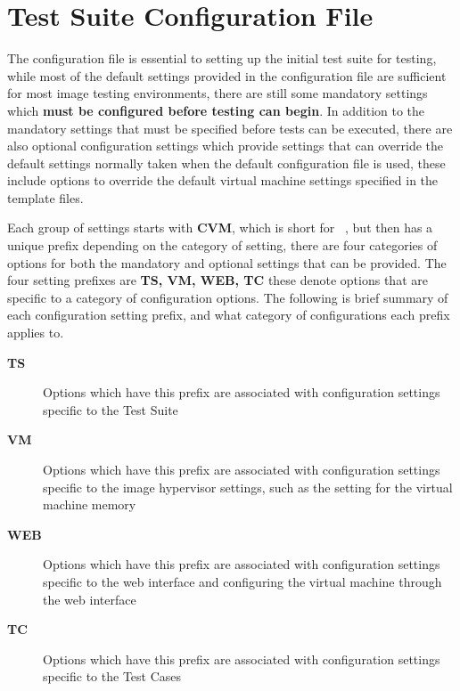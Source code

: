 \chapter{Test Suite Configuration File}
\label{sec:configfile}

The configuration file is essential to setting up the initial \cernvm test suite for testing, while most of the default 
settings provided in the configuration file are sufficient for most \cernvm image testing environments, there are still
some mandatory settings which {\bf must be configured before testing can begin}. In addition to the mandatory settings
that must be specified before tests can be executed, there are also optional configuration settings which provide settings
that can override the default settings normally taken when the default configuration file is used, these include options
to override the default virtual machine settings specified in the template files.

Each group of settings starts with {\bf CVM}, which is short for \cernvm~, but then has a unique prefix depending on the 
category of setting, there are four categories of options for both the mandatory and optional settings that can be provided. 
The four setting prefixes are {\bf TS, VM, WEB, TC} these denote options that are specific to a category of configuration options. 
The following is brief summary of each configuration setting prefix, and what category of configurations each prefix applies to.

\begin{description}
\item[{\bf TS}]		Options which have this prefix are associated with configuration settings specific to the
					\cernvmreleasetesting Test Suite

\item[{\bf VM}]		Options which have this prefix are associated with configuration settings specific to the
					\cernvm image hypervisor settings, such as the setting for the virtual machine memory
					
\item[{\bf WEB}]	Options which have this prefix are associated with configuration settings specific to the
					\cernvm web interface and configuring the virtual machine through the web interface
					
\item[{\bf TC}]		Options which have this prefix are associated with configuration settings specific to the
					\cernvm Test Cases
\end{description}


